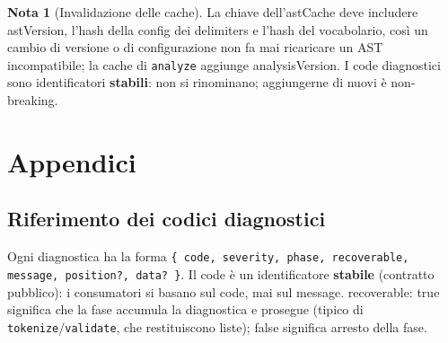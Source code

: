 \documentclass[11pt,a4paper]{book}
\let\code\lstinline
\newcommand{\ic}[1]{{\ttfamily #1}}
\theoremstyle{definition}
\newtheorem*{nota}{Nota}
\begin{document}
{{{{\begin{nota}[Invalidazione delle cache]
La chiave dell'\ic{astCache} deve includere \ic{astVersion}, l'hash della config dei
\ic{delimiters} e l'hash del vocabolario, così un cambio di versione o di
configurazione non fa mai ricaricare un AST incompatibile; la cache di \code|analyze|
aggiunge \ic{analysisVersion}. I \ic{code} diagnostici sono identificatori
\textbf{stabili}: non si rinominano; aggiungerne di nuovi è non-breaking.
\end{nota}

\appendix
\part{Appendici}

\chapter{Riferimento dei codici diagnostici}
\label{app:diagnostics}

Ogni diagnostica ha la forma \verb|{ code, severity, phase, recoverable, message, position?, data? }|.
Il \ic{code} è un identificatore \textbf{stabile} (contratto pubblico): i consumatori
si basano sul \ic{code}, mai sul \ic{message}. \ic{recoverable: true} significa che
la fase accumula la diagnostica e prosegue (tipico di \code|tokenize|/\code|validate|,
che restituiscono liste); \ic{false} significa arresto della fase.

}}}}
\end{document}
